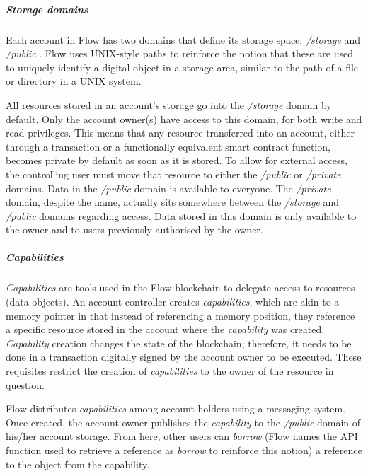 \documentclass[./4_GeneralApproach.tex]{subfiles}
\begin{document}
\subparagraph{Storage domains}
\label{storage_domains}
Each account in Flow has two domains that define its storage space: \textit{/storage} and \textit{/public} \cite{flow2024}. Flow uses UNIX-style paths to reinforce the notion that these are used to uniquely identify a digital object in a storage area, similar to the path of a file or directory in a UNIX system.
\par
All resources stored in an account's storage go into the \textit{/storage} domain by default. Only the account owner(s) have access to this domain, for both write and read privileges. This means that any resource transferred into an account, either through a transaction or a functionally equivalent smart contract function, becomes private by default as soon as it is stored. To allow for external access, the controlling user must move that resource to either the \textit{/public} or \textit{/private} domains. Data in the \textit{/public} domain is available to everyone. The \textit{/private} domain, despite the name, actually sits somewhere between the \textit{/storage} and \textit{/public} domains regarding access. Data stored in this domain is only available to the owner and to users previously authorised by the owner.

\subparagraph{Capabilities}
\label{capabilities_references}
\textit{Capabilities} are tools used in the Flow blockchain to delegate access to resources (data objects). An account controller creates \textit{capabilities}, which are akin to a memory pointer in that instead of referencing a memory position, they reference a specific resource stored in the account where the \textit{capability} was created. \textit{Capability} creation changes the state of the blockchain; therefore, it needs to be done in a transaction digitally signed by the account owner to be executed. These requisites restrict the creation of \textit{capabilities} to the owner of the resource in question.
\par
Flow distributes \textit{capabilities} among account holders using a messaging system. Once created, the account owner publishes the \textit{capability} to the \textit{/public} domain of his/her account storage. From here, other users can \textit{borrow} (Flow names the API function used to retrieve a reference as \textit{borrow} to reinforce this notion) a reference to the object from the capability.
\end{document}
